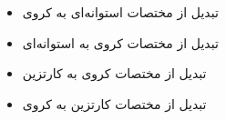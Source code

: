 \begin{ELimportant}{}


\end{ELimportant}

\begin{ELunit}

\begin{itemize}
\tightlist
\item
  تبدیل از مختصات استوانه‌ای به کروی
\end{itemize}


\begin{itemize}
\tightlist
\item
  تبدیل از مختصات کروی به استوانه‌ای
\end{itemize}


\begin{itemize}
\tightlist
\item
  تبدیل از مختصات کروی به کارتزین
\end{itemize}


\begin{itemize}
\tightlist
\item
  تبدیل از مختصات کارتزین به کروی
\end{itemize}



\end{ELunit}

